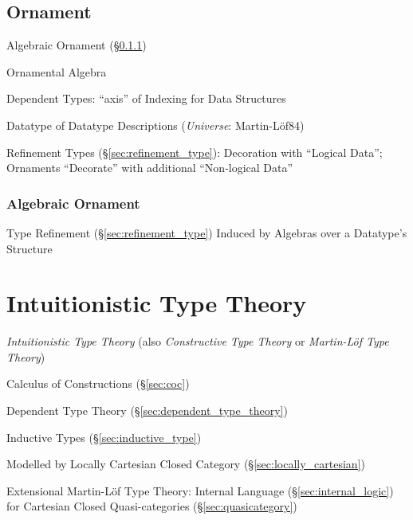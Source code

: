\subsection{Ornament}\label{sec:ornament}

\cite{mcbride13}

Algebraic Ornament (\S\ref{sec:algebraic_ornament})

Ornamental Algebra

Dependent Types: ``axis'' of Indexing for Data Structures

Datatype of Datatype Descriptions (\emph{Universe}: Martin-L\"of84)

Refinement Types (\S\ref{sec:refinement_type}): Decoration with
``Logical Data''; Ornaments ``Decorate'' with additional ``Non-logical
Data'' %



\subsubsection{Algebraic Ornament}\label{sec:algebraic_ornament}

Type Refinement (\S\ref{sec:refinement_type}) Induced by Algebras over
a Datatype's Structure



\section{Intuitionistic Type Theory}\label{sec:intuitionistic_type}

\cite{martinlof84}

\emph{Intuitionistic Type Theory} (also \emph{Constructive Type
  Theory} or \emph{Martin-L\"of Type Theory})

Calculus of Constructions (\S\ref{sec:coc})

Dependent Type Theory (\S\ref{sec:dependent_type_theory})

Inductive Types (\S\ref{sec:inductive_type})

Modelled by Locally Cartesian Closed Category
(\S\ref{sec:locally_cartesian})

Extensional Martin-L\"of Type Theory: Internal Language
(\S\ref{sec:internal_logic}) for Cartesian Closed Quasi-categories
(\S\ref{sec:quasicategory})


